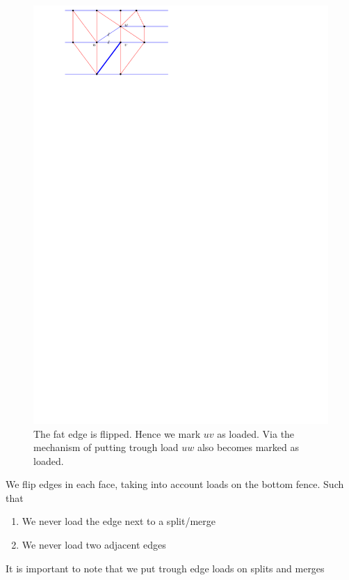 \begin{figure}[h]
  \centering
  \includegraphics[scale=1]{blueFaceSubdivision/img/puttingTroughLoad.pdf}
  \caption{The fat edge is flipped. Hence we mark $uv$ as loaded. Via the mechanism of putting trough load $uw$ also becomes marked as loaded.}
  \label{fig:subdiv:putTrougLoad}
\end{figure}


We flip edges in each face, taking into account loads on the bottom fence. Such that

\begin{enumerate}
  \item We never load the edge next to a split/merge
  \item We never load two adjacent edges
\end{enumerate}

It is important to note that we put trough edge loads on splits and merges

